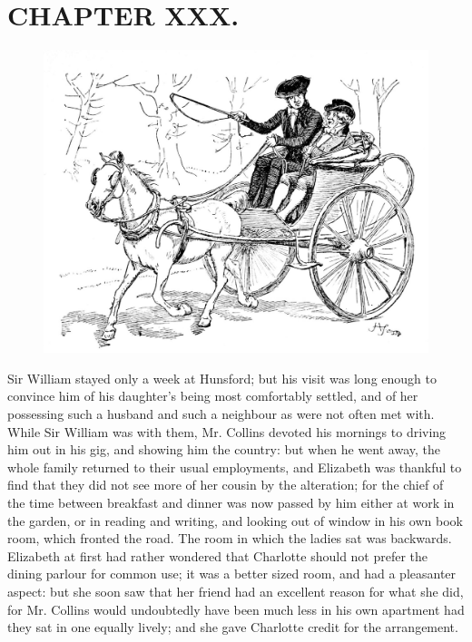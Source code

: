 \chapter{CHAPTER XXX.}

\begin{figure}[htbp]
    \centering
    \includegraphics[width=\textwidth]{illustrations/i_238_a.jpg}
\end{figure}


Sir William stayed only a week at Hunsford; but his visit was long enough to convince him of his daughter's being most comfortably settled, and of her possessing such a husband and such a neighbour as were not often met with. While Sir William was with them, Mr. Collins devoted his mornings to driving him out in his gig, and showing him the country: but when he went away, the whole family returned to their usual employments, and Elizabeth was thankful to find that they did not see more of her cousin by the alteration; for the chief of the time between breakfast and dinner was now passed by him either at work in the garden, or in reading and writing, and looking out of window in his own book room, which fronted the road. The room in which the ladies sat was backwards. Elizabeth at first had rather wondered that Charlotte should not prefer the dining parlour for common use; it was a better sized room, and had a pleasanter aspect: but she soon saw that her friend had an excellent reason for what she did, for Mr. Collins would undoubtedly have been much less in his own apartment had they sat in one equally lively; and she gave Charlotte credit for the arrangement.

